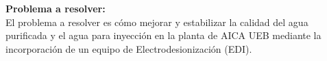 \textbf{Problema a resolver:}\\
El problema a resolver es cómo mejorar y estabilizar la calidad del agua purificada y el
agua para inyección en la planta de AICA UEB mediante la incorporación de un equipo de Electrodesionización
(EDI).

